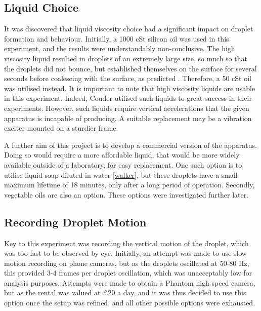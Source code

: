 \subsection{Liquid Choice}
It was discovered that liquid viscosity choice had a significant impact on droplet formation and behaviour. Initially, a 1000 cSt silicon oil was used in this experiment, and the results were understandably non-conclusive. The high viscosity liquid resulted in droplets of an extremely large size, so much so that the droplets did not bounce, but established themselves on the surface for several seconds before coalescing with the surface, as predicted \cite{couder}. Therefore, a 50 cSt oil was utilised instead. It is important to note that high viscosity liquids are usable in this experiment. Indeed, Couder utilised such liquids to great success in their experiments. However, such liquids require vertical accelerations that the given apparatus is incapable of producing. A suitable replacement may be a vibration exciter mounted on a sturdier frame. 

A further aim of this project is to develop a commercial version of the apparatus. Doing so would require a more affordable liquid, that would be more widely available outside of a laboratory, for easy replacement. One such option is to utilise liquid soap diluted in water \ref{walker}, but these droplets have a small maximum lifetime of 18 minutes, only after a long period of operation. Secondly, vegetable oils are also an option. These options were investigated further later.

\subsection{Recording Droplet Motion}
Key to this experiment was recording the vertical motion of the droplet, which was too fast to be observed by eye. Initially, an attempt was made to use slow motion recording on phone cameras, but as the droplets oscillated at 50-80 Hz, this provided 3-4 frames per droplet oscillation, which was unacceptably low for analysis purposes. Attempts were made to obtain a Phantom high speed camera, but as the rental was valued at \pounds 20 a day, and it was thus decided to use this option once the setup was refined, and all other possible options were exhausted. 

